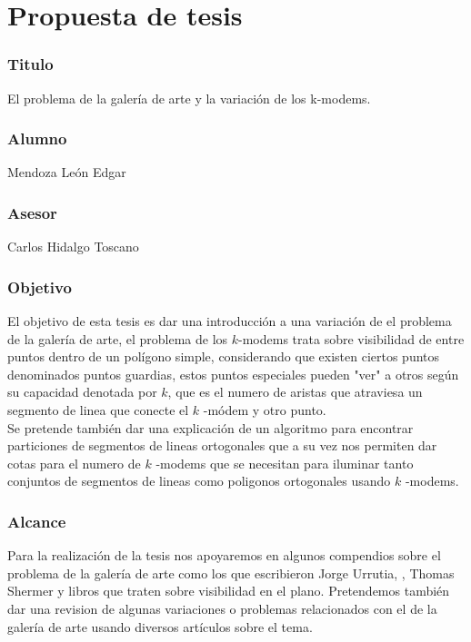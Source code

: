 \chapter*{Propuesta de tesis}

\subsection*{Titulo}
El problema de la galería de arte y la variación de los k-modems.

\subsection*{Alumno}
Mendoza León Edgar

\subsection*{Asesor}
Carlos Hidalgo Toscano

\subsection*{Objetivo}
El objetivo de esta tesis es dar una introducción a una variación de el problema
de la galería de arte, el problema de los $k$-modems trata sobre visibilidad de
entre puntos dentro de un polígono simple, considerando que existen ciertos
puntos denominados puntos guardias, estos puntos especiales pueden
\textnormal{"ver"} a otros según su capacidad denotada por $k$, que es el numero
de aristas que atraviesa un segmento de linea que conecte el $k$ -módem y otro
punto.\\

Se pretende también dar una explicación de un algoritmo para encontrar
particiones de segmentos de lineas ortogonales que a su vez nos permiten dar
cotas para el numero de $k$ -modems que se necesitan para iluminar tanto
conjuntos de segmentos de lineas como poligonos ortogonales usando $k$ -modems.

\subsection*{Alcance}
Para la realización de la tesis nos apoyaremos en algunos compendios sobre el
problema de la galería de arte como los que escribieron Jorge Urrutia,
, Thomas Shermer y libros que traten sobre visibilidad en el
plano. Pretendemos también dar una revision de algunas variaciones o problemas
relacionados con el de la galería de arte usando diversos artículos sobre el
tema.

